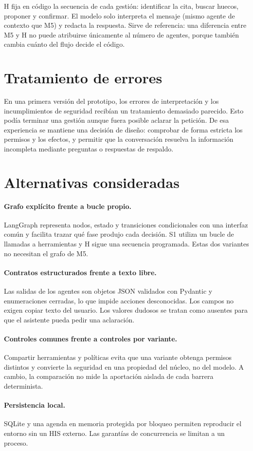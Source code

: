 H fija en código la secuencia de cada gestión: identificar la cita, buscar
huecos, proponer y confirmar. El modelo solo interpreta el mensaje (mismo
agente de contexto que M5) y redacta la respuesta. Sirve de referencia: una
diferencia entre M5 y H no puede atribuirse únicamente al número de agentes,
porque también cambia cuánto del flujo decide el código.

\section{Tratamiento de errores}

\label{sec:lecciones-v1}

En una primera versión del prototipo, los errores de interpretación y los
incumplimientos de seguridad recibían un tratamiento demasiado parecido. Esto
podía terminar una gestión aunque fuera posible aclarar la petición. De esa
experiencia se mantiene una decisión de diseño: comprobar de forma estricta
los permisos y los efectos, y permitir que la conversación resuelva la
información incompleta mediante preguntas o respuestas de respaldo.

\section{Alternativas consideradas}

\paragraph{Grafo explícito frente a bucle propio.} LangGraph representa nodos,
estado y transiciones condicionales con una interfaz común y facilita trazar
qué fase produjo cada decisión. S1 utiliza un bucle de llamadas a herramientas y H sigue una secuencia
programada. Estas dos variantes no necesitan el grafo de M5.

\paragraph{Contratos estructurados frente a texto libre.} Las salidas de los
agentes son objetos JSON validados con Pydantic y enumeraciones cerradas, lo
que impide acciones desconocidas. Los campos no exigen copiar texto del usuario. Los valores dudosos se tratan
como ausentes para que el asistente pueda pedir una aclaración.

\paragraph{Controles comunes frente a controles por variante.} Compartir
herramientas y políticas evita que una variante obtenga permisos distintos y
convierte la seguridad en una propiedad del núcleo, no del modelo. A cambio, la
comparación no mide la aportación aislada de cada barrera determinista.

\paragraph{Persistencia local.} SQLite y una agenda en memoria protegida por
bloqueo permiten reproducir el entorno sin un HIS externo. Las garantías de
concurrencia se limitan a un proceso.
